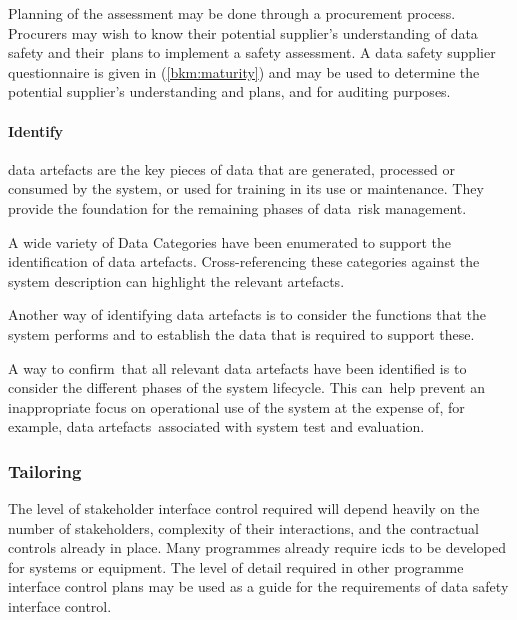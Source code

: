 Planning of the assessment may be done through a procurement process. Procurers may wish to \cbstart know their potential supplier's understanding of data safety and their\cbend\ plans to implement a \gls{safety assessment}. \cbstart A data safety supplier questionnaire is given in (\autoref{bkm:maturity}) and may be used to determine the potential supplier's understanding and plans, and for auditing purposes\cbend.

\paragraph{Identify }
\Glspl{data artefact} are the key pieces of data that are generated, processed or consumed by the system, or used for training in its use or maintenance. They provide the foundation for the remaining phases of \cbstart data\cbend\ risk management.

\cbstart A wide variety of Data Categories have been enumerated to support the identification of \glspl{data artefact}. Cross-referencing these categories against the system description can highlight the relevant artefacts.\cbend\ 

Another way of identifying \glspl{data artefact} \cbstart is to consider the functions that the system performs and to establish the data that is required to support these\cbend.

A \cbstart way to confirm\cbend\ that all relevant \glspl{data artefact} have been identified is to consider the different phases of the system lifecycle. This \cbstart can\cbend\ help prevent an inappropriate focus on operational use of the system at the expense of, for example, \cbstart\glspl{data artefact}\cbend\ associated with system test and evaluation.

\subsubsection{Tailoring}
The level of
\gls{stakeholder}
interface control required will depend heavily on the number of \glspl{stakeholder}, complexity of their interactions, and the contractual controls already in place. Many programmes already require \glspl{icd} to be developed for systems or equipment. The level of detail required in other programme interface control plans may be used as a guide for the requirements of data safety interface control. 

